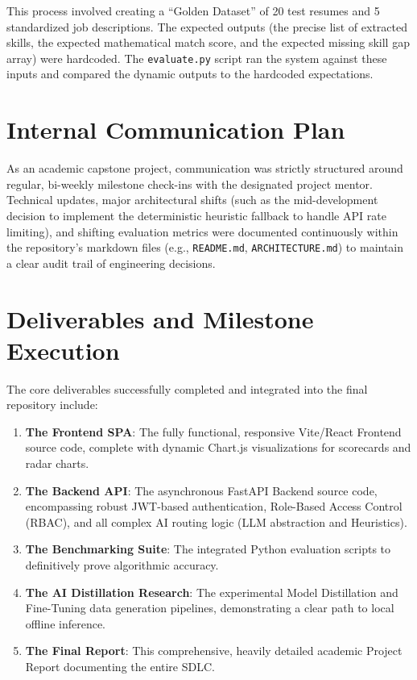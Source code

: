 \documentclass[12pt,a4paper]{report}
\begin{document}
This process involved creating a ``Golden Dataset'' of 20 test resumes and 5 standardized job descriptions. The expected outputs (the precise list of extracted skills, the expected mathematical match score, and the expected missing skill gap array) were hardcoded. The \texttt{evaluate.py} script ran the system against these inputs and compared the dynamic outputs to the hardcoded expectations.

\section{Internal Communication Plan}

As an academic capstone project, communication was strictly structured around regular, bi-weekly milestone check-ins with the designated project mentor. Technical updates, major architectural shifts (such as the mid-development decision to implement the deterministic heuristic fallback to handle API rate limiting), and shifting evaluation metrics were documented continuously within the repository's markdown files (e.g., \texttt{README.md}, \texttt{ARCHITECTURE.md}) to maintain a clear audit trail of engineering decisions.

\section{Deliverables and Milestone Execution}

The core deliverables successfully completed and integrated into the final repository include:
\begin{enumerate}
    \item \textbf{The Frontend SPA}: The fully functional, responsive Vite/React Frontend source code, complete with dynamic Chart.js visualizations for scorecards and radar charts.
    \item \textbf{The Backend API}: The asynchronous FastAPI Backend source code, encompassing robust JWT-based authentication, Role-Based Access Control (RBAC), and all complex AI routing logic (LLM abstraction and Heuristics).
    \item \textbf{The Benchmarking Suite}: The integrated Python evaluation scripts to definitively prove algorithmic accuracy.
    \item \textbf{The AI Distillation Research}: The experimental Model Distillation and Fine-Tuning data generation pipelines, demonstrating a clear path to local offline inference.
    \item \textbf{The Final Report}: This comprehensive, heavily detailed academic Project Report documenting the entire SDLC.
\end{enumerate}
\end{document}
